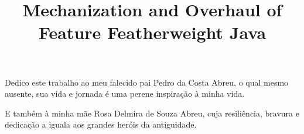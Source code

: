 \documentclass[bacharelado]{unb-cic}
\title{Mechanization and Overhaul of Feature Featherweight Java}
\theoremstyle{definition}
\theoremstyle{definition}
\begin{document}
  \maketitle
  \pretextual

  \begin{dedicatoria}
      Dedico este trabalho ao meu falecido pai Pedro da Costa Abreu,
      o qual mesmo ausente, sua vida e jornada é uma perene inspiração
      à minha vida.

      E também à minha mãe Rosa Delmira de Souza Abreu, cuja resiliência,
      bravura e dedicação a iguala aos grandes heróis da antiguidade.
  \end{dedicatoria}

  \begin{agradecimentos}
  \end{agradecimentos}


  
  \tableofcontents
  \printglossary
  \listoffigures
  \listoftables

  \textual    
  
  
  
  
  
  
  


  \postextual
  
  
\end{document}
